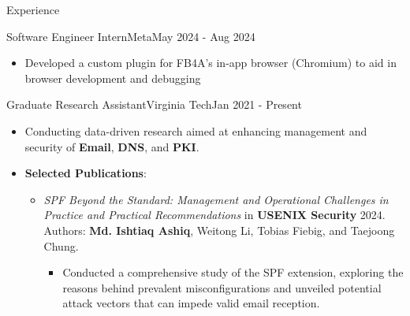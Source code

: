 \documentclass[]{mcdowellcv}
\begin{document}
	\begin{cvsection}{Experience}
		\begin{cvsubsection}{Software Engineer Intern}{Meta}{May 2024 - Aug 2024}
			\begin{itemize}
				\item Developed a custom plugin for FB4A's in-app browser (Chromium) to aid in browser development and debugging
			\end{itemize}
		\end{cvsubsection}
		\begin{cvsubsection}{Graduate Research Assistant}{Virginia Tech}{Jan 2021 - Present}
			\begin{itemize}
				\item Conducting data-driven research aimed at enhancing management and security of \textbf{Email}, \textbf{DNS}, and \textbf{PKI}.
				\item \textbf{Selected Publications}:
				\begin{itemize}
					\item \textit{SPF Beyond the Standard: Management and Operational Challenges in Practice and Practical Recommendations} in \textbf{USENIX Security} 2024. Authors: \textbf{Md. Ishtiaq Ashiq}, Weitong Li, Tobias Fiebig, and Taejoong Chung. %
					\begin{itemize}
						\item Conducted a comprehensive study of the SPF extension, exploring the reasons behind prevalent
						misconfigurations and unveiled potential attack vectors that can impede valid email reception.

\end{itemize}
\end{itemize}
\end{itemize}
\end{cvsubsection}
\end{cvsection}
\end{document}
